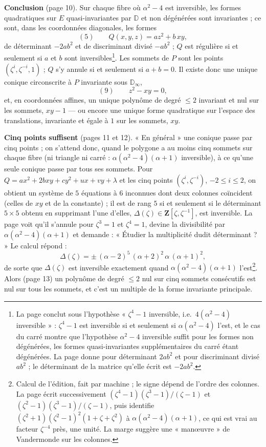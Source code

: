 \documentclass[11pt,a4paper]{article}
\begin{document}
\textbf{Conclusion} (page 10). Sur chaque fibre où $\alpha^2 - 4$ est inversible,
les formes quadratiques sur $E$ quasi-invariantes par $\mathbb{D}$ et non
dégénérées sont invariantes ; ce sont, dans les coordonnées diagonales, les
formes
\[
  (5) \qquad Q(x, y, z) = a z^2 + b\, xy ,
\]
de déterminant $-2ab^2$ et de discriminant divisé $-ab^2$ ; $Q$ est régulière si
et seulement si $a$ et $b$ sont inversibles\footnote{La page conclut sous
l'hypothèse « $\zeta^4 - 1$ inversible, i.e.\ $4(\alpha^2 - 4)$ inversible » :
$\zeta^4 - 1$ est inversible si et seulement si $\alpha(\alpha^2 - 4)$ l'est, et le
cas du carré montre que l'hypothèse $\alpha^2 - 4$ inversible suffit pour les
formes non dégénérées, les formes quasi-invariantes supplémentaires du carré
étant dégénérées. La page donne pour déterminant $2ab^2$ et pour discriminant
divisé $ab^2$ ; le déterminant de la matrice qu'elle écrit est $-2ab^2$.}. Les
sommets de $P$ sont les points $(\zeta^i, \zeta^{-i}, 1)$ ; $Q$ s'y annule si et
seulement si $a + b = 0$. Il existe donc une unique conique circonscrite à $P$
invariante sous $\mathbb{D}_\infty$,
\[
  (9) \qquad z^2 - xy = 0,
\]
et, en coordonnées affines, un unique polynôme de degré $\leq 2$ invariant et nul
sur les sommets, $xy - 1$ — ou encore une unique forme quadratique sur l'espace
des translations, invariante et égale à $1$ sur les sommets, $xy$.

\textbf{Cinq points suffisent} (pages 11 et 12). « En général » une conique passe
par cinq points ; on s'attend donc, quand le polygone a au moins cinq sommets
sur chaque fibre (ni triangle ni carré : $\alpha(\alpha^2 - 4)(\alpha + 1)$
inversible), à ce qu'une seule conique passe par tous ses sommets. Pour $Q =
ax^2 + 2bxy + cy^2 + ux + vy + \lambda$ et les cinq points $(\zeta^i, \zeta^{-i})$,
$-2 \leq i \leq 2$, on obtient un système de $5$ équations à $6$ inconnues dont
deux colonnes coïncident (celles de $xy$ et de la constante) ; il est de rang $5$
si et seulement si le déterminant $5 \times 5$ obtenu en supprimant l'une d'elles,
$\Delta(\zeta) \in \mathbf{Z}[\zeta, \zeta^{-1}]$, est inversible. La page voit
qu'il s'annule pour $\zeta^3 = 1$ et $\zeta^4 = 1$, devine la divisibilité par
$\alpha(\alpha^2 - 4)(\alpha + 1)$ et demande : « Étudier la multiplicité dudit
déterminant ? » Le calcul répond :
\[
  \Delta(\zeta) = \pm\, (\alpha - 2)^5\, (\alpha + 2)^2\, \alpha\, (\alpha + 1)^2 ,
\]
de sorte que $\Delta(\zeta)$ est inversible exactement quand $\alpha(\alpha^2 -
4)(\alpha + 1)$ l'est\footnote{Calcul de l'édition, fait par machine ; le signe
dépend de l'ordre des colonnes. La page écrit successivement
$(\zeta^4 - 1)(\zeta^3 - 1)/(\zeta - 1)$ et $(\zeta^2 - 1)(\zeta^3 - 1)/(\zeta - 1)$,
puis identifie $(\zeta^2 + 1)(\zeta^2 - 1)^2(1 + \zeta + \zeta^2)$ à
$\alpha(\alpha^2 - 4)(\alpha + 1)$, ce qui est vrai au facteur $\zeta^{-4}$ près,
une unité. La marge suggère une « manœuvre » de Vandermonde sur les colonnes.}.
Alors (page 13) un polynôme de degré $\leq 2$ nul sur cinq sommets consécutifs
est nul sur tous les sommets, et c'est un multiple de la forme invariante
principale.
\end{document}
